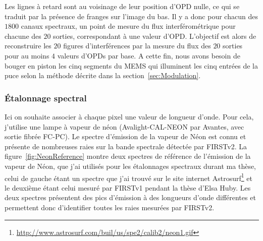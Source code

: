 Les lignes à retard sont au voisinage de leur position d'\ac{OPD} nulle, ce qui se traduit par la présence de franges sur l'image du bas. Il y a donc pour chacun des $1800$ canaux spectraux, un point de mesure du flux interférométrique pour chacune des $20$ sorties, correspondant à une valeur d'\ac{OPD}. L'objectif est alors de reconstruire les $20$ figures d'interférences par la mesure du flux des $20$ sorties pour au moins $4$ valeurs d'\ac{OPD}s par base. A cette fin, nous avons besoin de bouger en piston les cinq segments du \ac{MEMS} qui illuminent les cinq entrées de la puce selon la méthode décrite dans la section~\ref{sec:Modulation}.


\subsubsection{Étalonnage spectral}
\label{sec:EtalonnageSpectral}

Ici on souhaite associer à chaque pixel une valeur de longueur d'onde. Pour cela, j'utilise une lampe à vapeur de néon (Avalight-CAL-NEON par Avantes, avec sortie fibrée FC-PC). Le spectre d'émission de la vapeur de Néon est connu et présente de nombreuses raies sur la bande spectrale détectée par \ac{FIRSTv2}. La figure~\ref{fig:NeonReference} montre deux spectres de référence de l'émission de la vapeur de Néon, que j'ai utilisés pour les étalonnages spectraux durant ma thèse, celui de gauche étant un spectre que j'ai trouvé sur le site internet Astrosurf\footnote{\url{http://www.astrosurf.com/buil/us/spe2/calib2/neon1.gif}} et le deuxième étant celui mesuré par \ac{FIRSTv1} pendant la thèse d'Elsa Huby. Les deux spectres présentent des pics d'émission à des longueurs d'onde différentes et permettent donc d'identifier toutes les raies mesurées par \ac{FIRSTv2}.

